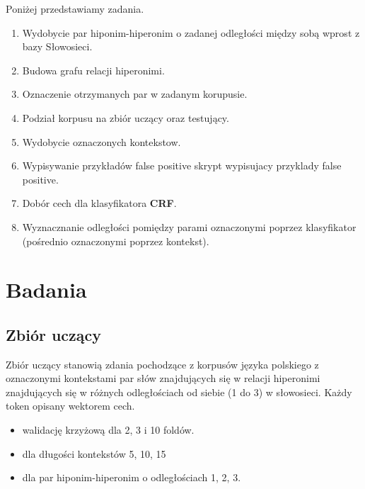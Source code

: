 \documentclass[a4paper,10pt]{report}
\begin{document}
\noindent Poniżej przedstawiamy zadania.
\begin{enumerate}
 \item Wydobycie par hiponim-hiperonim o zadanej odległości między sobą wprost z bazy Słowosieci. %
 \item Budowa grafu relacji hiperonimi. %
 \item Oznaczenie otrzymanych par w zadanym korupusie. %
 \item Podział korpusu na zbiór uczący oraz testujący. %
 \item Wydobycie oznaczonych kontekstow. %
 \item Wypisywanie przykładów false positive skrypt wypisujacy przyklady false positive.
 \item Dobór cech dla klasyfikatora \textbf{CRF}.  %
 
 \item Wyznacznanie odległości pomiędzy parami oznaczonymi poprzez klasyfikator (pośrednio oznaczonymi poprzez kontekst).  %
\end{enumerate}

\section{Badania}

\subsection{Zbiór uczący}

Zbiór uczący stanowią zdania pochodzące z korpusów języka polskiego z oznaczonymi kontekstami par słów znajdujących się w relacji hiperonimi znajdujących się w różnych odległościach od siebie (1 do 3) w słowosieci. Każdy token opisany wektorem cech.

\begin{itemize}
 \item walidację krzyżową dla 2, 3 i 10 foldów.
 \item dla długości kontekstów 5, 10, 15
 \item dla par hiponim-hiperonim o odległościach 1, 2, 3.
\end{itemize}
\end{document}
